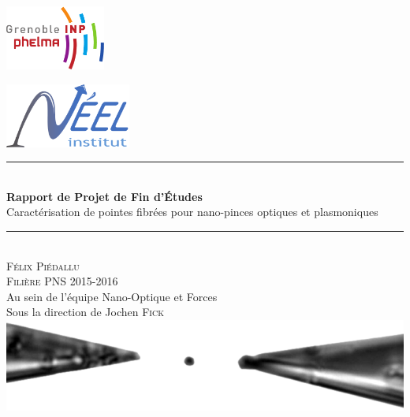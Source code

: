 \begin{titlepage}
    \vspace*{-10px}
    \includegraphics[height=80px]{Images/logo_phelma.pdf}
    \vspace*{-80px}
\begin{flushright}
    \vspace*{-10px}
    \includegraphics[height=80px]{Images/Logo_Neel.pdf}
\end{flushright}

\vspace*{1.5cm}
\begin{center}
\rule{\linewidth}{0.5mm}\\[0.4cm]
{\huge{\bfseries Rapport de Projet de Fin d'Études}\\[0.4cm]
Caractérisation de pointes fibrées pour nano-pinces optiques et plasmoniques\\[0.4cm]}
\rule{\linewidth}{0.5mm}\\[0.5cm]

\LARGE{\textsc{Félix Piédallu}}\\[0.7cm]
\large{\textsc{Filière PNS 2015-2016}}\\[2cm]

\Large{Au sein de l'équipe Nano-Optique et Forces}\\[1cm]

\Large{Sous la direction de Jochen \textsc{Fick}}\\[2cm]

\includegraphics[width=\textwidth]{Images/Illustration.png}\\[1cm]


\end{center}
\end{titlepage}

\tableofcontents        %
\newpage
\listoffigures
{}  %
